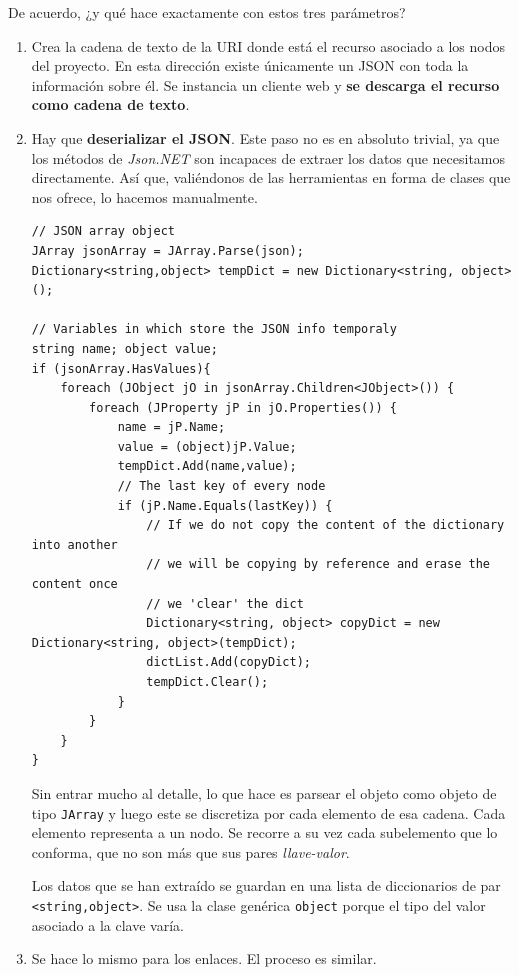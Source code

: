 De acuerdo, ¿y qué hace exactamente con estos tres parámetros?
\begin{enumerate}
\item Crea la cadena de texto de la URI donde está el recurso asociado a los nodos del proyecto. En esta dirección existe únicamente un JSON con toda la información sobre él. Se instancia un cliente web y \textbf{se descarga el recurso como cadena de texto}.

\item Hay que \textbf{deserializar el JSON}. Este paso no es en absoluto trivial, ya que los métodos de \textit{Json.NET} son incapaces de extraer los datos que necesitamos directamente. Así que, valiéndonos de las herramientas en forma de clases que nos ofrece, lo hacemos manualmente.
\begin{lstlisting}[language={[Sharp]C}, caption={Deserialización de JSON}, label={gnscs2}]
// JSON array object
JArray jsonArray = JArray.Parse(json);
Dictionary<string,object> tempDict = new Dictionary<string, object>();

// Variables in which store the JSON info temporaly
string name; object value;        
if (jsonArray.HasValues){
    foreach (JObject jO in jsonArray.Children<JObject>()) {
        foreach (JProperty jP in jO.Properties()) {                
            name = jP.Name;
            value = (object)jP.Value;
            tempDict.Add(name,value);
            // The last key of every node
            if (jP.Name.Equals(lastKey)) {
                // If we do not copy the content of the dictionary into another
                // we will be copying by reference and erase the content once
                // we 'clear' the dict
                Dictionary<string, object> copyDict = new Dictionary<string, object>(tempDict);
                dictList.Add(copyDict);
                tempDict.Clear();
            }
        }
    }
}
\end{lstlisting}
Sin entrar mucho al detalle, lo que hace es parsear el objeto como objeto de tipo \texttt{JArray} y luego este se discretiza por cada elemento de esa cadena. Cada elemento representa a un nodo. Se recorre a su vez cada subelemento que lo conforma, que no son más que sus pares \textit{llave-valor}.

Los datos que se han extraído se guardan en una lista de diccionarios de par \texttt{<string,object>}. Se usa la clase genérica \texttt{object} porque el tipo del valor asociado a la clave varía.

\item Se hace lo mismo para los enlaces. El proceso es similar.


\end{enumerate}
